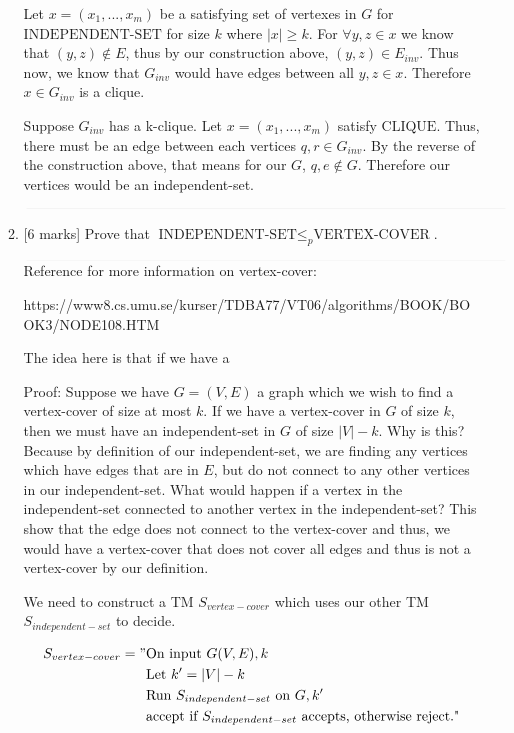 \documentclass{article}
\newcommand{\class}[1]{\text{#1}}
\begin{document}
\begin{enumerate}
\begin{enumerate}
            Let $x = (x_1, . . . , x_m)$ be a satisfying set of vertexes in $G$ for $\class{INDEPENDENT-SET}$ for size $k$ where $|x| \geq k$. For $\forall y,z \in x$ we know that $(y,z) \not\in E$, thus by our construction above, $(y,z) \in E_{inv}$. Thus now, we know that $G_{inv}$ would have edges between all $y,z \in x$. Therefore $x \in G_{inv}$ is a clique.

         Suppose $G_{inv}$ has a k-clique. Let $x = (x_1, . . . , x_m)$ satisfy $\class{CLIQUE}$. Thus, there must be an edge between each vertices $q,r \in G_{inv}$. By the reverse of the construction above, that means for our $G$, $q,e \not\in G$. Therefore our vertices would be an independent-set.

            $\textcolor[RGB]{220,220,220}{\rule{\linewidth}{0.2pt}}$

        \item {[6 marks]} Prove that $\class{INDEPENDENT-SET}\leq_p\class{VERTEX-COVER}$.

            $\textcolor[RGB]{220,220,220}{\rule{\linewidth}{0.2pt}}$
            Reference for more information on vertex-cover:

            https://www8.cs.umu.se/kurser/TDBA77/VT06/algorithms/BOOK/BOOK3/NODE108.HTM

            The idea here is that if we have a

            Proof: Suppose we have $G = (V,E)$ a graph which we wish to find a vertex-cover of size at most $k$. If we have a vertex-cover in $G$ of size $k$, then we must have an independent-set in $G$ of size $|V| - k$. Why is this? Because by definition of our independent-set, we are finding any vertices which have edges that are in $E$, but do not connect to any other vertices in our independent-set. What would happen if a vertex in the independent-set connected to another vertex in the independent-set? This show that the edge does not connect to the vertex-cover and thus, we would have a vertex-cover that does not cover all edges and thus is not a vertex-cover by our definition.

            We need to construct a TM $S_{vertex-cover}$ which uses our other TM $S_{independent-set}$ to decide.

            \begin{equation}
            	\begin{split}
            		S_{vertex-cover} = "& \text{On input $G(V,E),k$} \\
            				    & \text{Let $k^\prime = |V| - k$} \\
            				    & \text{Run $S_{independent-set}$ on $G,k^\prime$} \\
            				    & \text{accept if $S_{independent-set}$ accepts, otherwise reject."}
            	\end{split}
            \end{equation}


\end{enumerate}
\end{enumerate}
\end{document}
